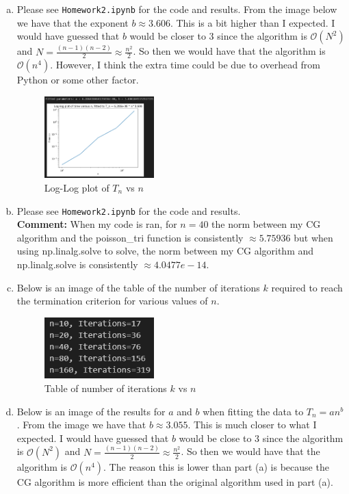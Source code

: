 \documentclass{article}
\begin{document}
\newpage
\begin{enumerate}[(a)]
    \item Please see \texttt{Homework2.ipynb} for the code and results. From the image below we have that the exponent $b \approx 3.606$. This is a bit higher than I expected. I would have guessed that $b$ would be closer to $3$ since the algorithm is $\mathcal{O}(N^2)$ and $N = \frac{(n-1)(n-2)}{2} \approx \frac{n^2}{2}$. So then we would have that the algorithm is $\mathcal{O}(n^4)$. However, I think the extra time could be due to overhead from Python or some other factor.
    \begin{figure}[H]
        \centering
        \includegraphics[width=0.4\textwidth]{Q1a.png}
        \caption{Log-Log plot of $T_n$ vs $n$}
    \end{figure}
    \item Please see \texttt{Homework2.ipynb} for the code and results. \\
    \textbf{Comment:} When my code is ran, for $n = 40$ the norm between my CG algorithm and the poisson\_tri function is consistently $ \approx 5.75936$ but when using np.linalg.solve to solve, the norm between my CG algorithm and np.linalg.solve is consistently $ \approx 4.0477e-14$. 
    \item Below is an image of the table of the number of iterations $k$ required to reach the termination criterion for various values of $n$.
    \begin{figure}[H]
        \centering
        \includegraphics[width=0.4\textwidth]{Q1c.png}
        \caption{Table of number of iterations $k$ vs $n$}
    \end{figure}
    \item Below is an image of the results for $a$ and $b$ when fitting the data to $T_n = an^b$. From the image we have that $b \approx 3.055$. This is much closer to what I expected. I would have guessed that $b$ would be close to $3$ since the algorithm is $\mathcal{O}(N^2)$ and $N = \frac{(n-1)(n-2)}{2} \approx \frac{n^2}{2}$. So then we would have that the algorithm is $\mathcal{O}(n^4)$. The reason this is lower than part (a) is because the CG algorithm is more efficient than the original algorithm used in part (a).

\end{enumerate}
\end{document}
